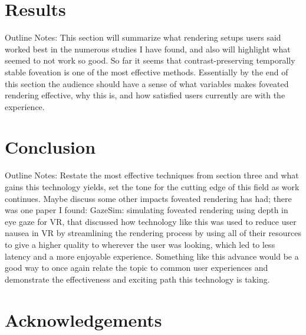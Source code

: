 \documentclass{sig-alternate}
\begin{document}
\section{Results}
\label{sec:results}

Outline Notes: This section will summarize what rendering setups users said worked best in the numerous studies I have found, and also will highlight what seemed to not work so good. So far it seems that contrast-preserving temporally stable foveation is one of the most effective methods. Essentially by the end of this section the audience should have a sense of what variables makes foveated rendering effective, why this is, and how satisfied users currently are with the experience.

\section{Conclusion}
\label{sec:conclusion}
Outline Notes: Restate the most effective techniques from section three and what gains this technology yields, set the tone for the cutting edge of this field as work continues. Maybe discuss some other impacts foveated rendering has had; there was one paper I found: GazeSim: simulating foveated rendering using depth in eye gaze for VR, that discussed how technology like this was used to reduce user nausea in VR by streamlining the rendering process by using all of their resources to give a higher quality to wherever the user was looking, which led to less latency and a more enjoyable experience. Something like this advance would be a good way to once again relate the topic to common user experiences and demonstrate the effectiveness and exciting path this technology is taking.

\section{Acknowledgements}
\label{sec:acknowledgments}



  
\end{document}
